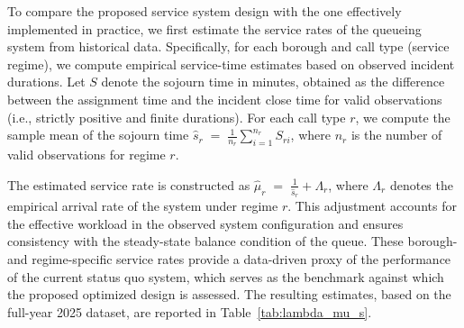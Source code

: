\documentclass[letter,11pt, reqno]{amsart}
\begin{document}
To compare the proposed service system design with the one effectively implemented in practice, we first estimate the service rates of the queueing system from historical data. Specifically, for each borough and call type (service regime), we compute empirical service-time estimates based on observed incident durations. Let $S$ denote the sojourn time in minutes, obtained as the difference between the assignment time and the incident close time for valid observations (i.e., strictly positive and finite durations). For each call type $r$, we compute the sample mean of the sojourn time $
\widehat{s}_r \;=\; \frac{1}{n_r}\sum_{i=1}^{n_r} S_{ri}$, where $n_r$ is the number of valid observations for regime $r$. 

The estimated service rate is constructed as $
\widehat{\mu}_r \;=\; \frac{1}{\widehat{s}_r} + \Lambda_r$, where $\Lambda_r$ denotes the empirical arrival rate of the system under regime $r$. This adjustment accounts for the effective workload in the observed system configuration and ensures consistency with the steady-state balance condition of the queue. These borough- and regime-specific service rates provide a data-driven proxy of the performance of the current status quo system, which serves as the benchmark against which the proposed optimized design is assessed. The resulting estimates, based on the full-year 2025 dataset, are reported in Table~\ref{tab:lambda_mu_s}. 
\end{document}

